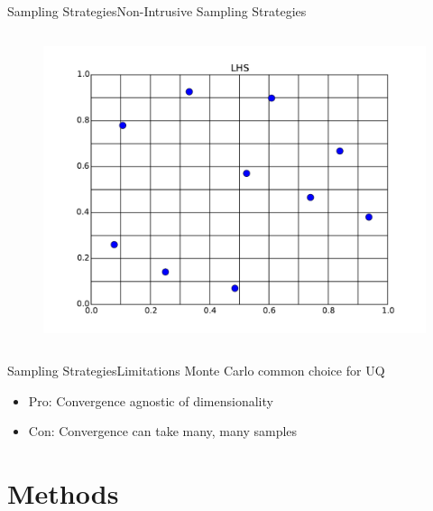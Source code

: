 \documentclass{beamer}
\begin{document}
\begin{frame}{Sampling Strategies}{Non-Intrusive Sampling Strategies}
\begin{columns}
\begin{column}{0.4\textwidth}
\begin{figure}[h!]
        \includegraphics[width=\textwidth]{../../graphics/lhs}
    \end{figure}
  \end{column}
  \end{columns}
\end{frame}

\begin{frame}{Sampling Strategies}{Limitations}\vspace{-20pt}
  Monte Carlo common choice for UQ\vspace{10pt}
  \begin{itemize}
    \item Pro: Convergence agnostic of dimensionality
    \item Con: Convergence can take many, many samples
  \end{itemize}
\end{frame}

\section{Methods}
\end{document}
